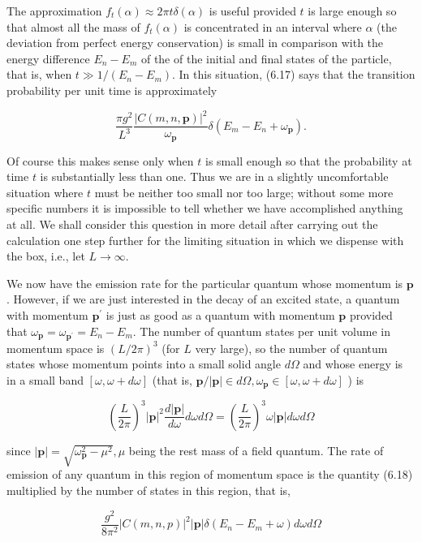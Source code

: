 \documentclass[10pt, letterpaper]{article}
\begin{document}
The approximation $f_{t}(\alpha) \approx 2 \pi t \delta(\alpha)$ is useful provided $t$ is large enough so that almost all the mass of $f_{t}(\alpha)$ is concentrated in an interval where $\alpha$ (the deviation from perfect energy conservation) is small in comparison with the energy difference $E_{n}-E_{m}$ of the of the initial and final states of the particle, that is, when $t \gg 1 /\left(E_{n}-E_{m}\right)$. In this situation, (6.17) says that the transition probability per unit time is approximately

$$
\frac{\pi g^{2}}{L^{3}} \frac{|C(m, n, \mathbf{p})|^{2}}{\omega_{\mathbf{p}}} \delta\left(E_{m}-E_{n}+\omega_{\mathbf{p}}\right) .
$$

Of course this makes sense only when $t$ is small enough so that the probability at time $t$ is substantially less than one. Thus we are in a slightly uncomfortable situation where $t$ must be neither too small nor too large; without some more specific numbers it is impossible to tell whether we have accomplished anything at all. We shall consider this question in more detail after carrying out the calculation one step further for the limiting situation in which we dispense with the box, i.e., let $L \rightarrow \infty$.

We now have the emission rate for the particular quantum whose momentum is $\mathbf{p}$. However, if we are just interested in the decay of an excited state, a quantum with momentum $\mathbf{p}^{\prime}$ is just as good as a quantum with momentum $\mathbf{p}$ provided that $\omega_{\mathbf{p}}=\omega_{\mathbf{p}^{\prime}}=E_{n}-E_{m}$. The number of quantum states per unit volume in momentum space is $(L / 2 \pi)^{3}$ (for $L$ very large), so the number of quantum states whose momentum points into a small solid angle $d \Omega$ and whose energy is in a small band $[\omega, \omega+d \omega]$ (that is, $\mathbf{p} /|\mathbf{p}| \in d \Omega, \omega_{\mathbf{p}} \in[\omega, \omega+d \omega]$ ) is

$$
\left(\frac{L}{2 \pi}\right)^{3}|\mathbf{p}|^{2} \frac{d|\mathbf{p}|}{d \omega} d \omega d \Omega=\left(\frac{L}{2 \pi}\right)^{3} \omega|\mathbf{p}| d \omega d \Omega
$$

since $|\mathbf{p}|=\sqrt{\omega_{\mathbf{p}}^{2}-\mu^{2}}, \mu$ being the rest mass of a field quantum. The rate of emission of any quantum in this region of momentum space is the quantity (6.18) multiplied by the number of states in this region, that is,

$$
\frac{g^{2}}{8 \pi^{2}}|C(m, n, p)|^{2}|\mathbf{p}| \delta\left(E_{n}-E_{m}+\omega\right) d \omega d \Omega
$$
\end{document}
